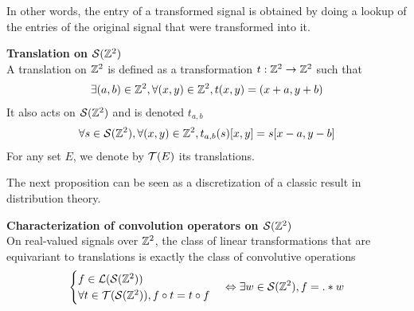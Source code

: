 In other words, the entry of a transformed signal is obtained by doing a lookup of the entries of the original signal that were transformed into it.

\begin{definition}\textbf{Translation on $\mathcal{S}(\mathbb{Z}^2)$}\\
A translation on $\mathbb{Z}^2$ is defined as a transformation $t: \mathbb{Z}^2 \rightarrow \mathbb{Z}^2$ such that
\begin{gather*}
\exists (a,b) \in \mathbb{Z}^2, \forall (x,y) \in \mathbb{Z}^2, t(x,y) = (x+a,y+b)
\end{gather*}
It also acts on $\mathcal{S}(\mathbb{Z}^2)$ and is denoted $t_{a,b}$ \ie
\begin{gather*}
\forall s \in \mathcal{S}(\mathbb{Z}^2), \forall (x,y) \in \mathbb{Z}^2, t_{a,b}(s)[x,y] = s[x-a, y-b]
\end{gather*}
For any set $E$, we denote by $\mathcal{T}(E)$ its translations.
\end{definition}

The next proposition can be seen as a discretization of a classic result in distribution theory.

\begin{proposition}\textbf{Characterization of convolution operators on $\mathcal{S}(\mathbb{Z}^2)$}\\
On real-valued signals over $\mathbb{Z}^2$, the class of linear transformations that are equivariant to translations is exactly the class of convolutive operations \ie
\begin{gather*}
\begin{cases}
 f \in \mathcal{L}(\mathcal{S}(\mathbb{Z}^2))\\
 \forall t \in \mathcal{T}(\mathcal{S}(\mathbb{Z}^2)), f \circ t = t \circ f
\end{cases}
 \Leftrightarrow \exists w \in \mathcal{S}(\mathbb{Z}^2), f = . \ast w
\end{gather*}
\label{prop:equi}
\end{proposition}

